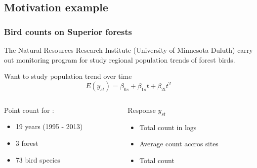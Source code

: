 \documentclass[9pt]{beamer}\usepackage[]{graphicx}\usepackage[]{color}
\begin{document}
\subsection{Motivation example}
\begin{frame}
\frametitle{Bird counts on Superior forests}
 The Natural Resources Research Institute (University of Minnesota Duluth) carry out monitoring program for study regional population trends of forest birds.
\vspace{.5cm}

Want to study population trend over time
\[
E(y_{st})  = \beta_{0s} + \beta_{1s} t + \beta_{2t}t^2
\]

\begin{columns}
\begin{column}{4cm}
Point count for :
\begin{itemize}
  \item 19 years (1995 - 2013)
  \item 3 forest
  \item 73 bird species
\end{itemize}
\end{column}
\begin{column}{5cm}
Response $y_{st}$
\begin{itemize}
  \item Total count in logs
  \item Average count accros sites
  \item Total count
\end{itemize}

\end{column}
\end{columns}

\end{frame}
\end{document}
